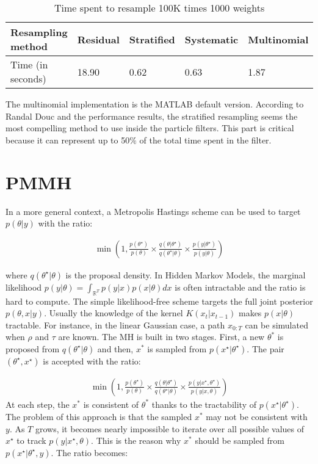 \documentclass[11pt,a4,twosided,singlespacing,titlepagenumber=on]{scrreprt}
\numberwithin{equation}{chapter} %
\theoremstyle{remark}
\begin{document}
\begin{table}[h]
\centering
\label{table1}
\begin{tabular}{|l|l|l|l|l|}
\hline
Resampling method     & Residual & Stratified & Systematic & Multinomial \\ \hline
Time (in seconds) & 18.90    & 0.62       & 0.63       & 1.87        \\ \hline
\end{tabular}
\caption{Time spent to resample 100K times 1000 weights}
\end{table}
The multinomial implementation is the MATLAB default version. According to Randal Douc and the performance results, the stratified resampling seems the most compelling method to use inside the particle filters. This part is critical because it can represent up to 50$\%$ of the total time spent in the filter.

\section{PMMH}

In a more general context, a Metropolis Hastings scheme can be used to target $p(\theta| y)$ with the ratio:

\begin{align*}
\min \left( 1, \frac{p(\theta^\star)}{p(\theta)} \times  \frac{q(\theta|\theta^\star)}{q(\theta^\star|\theta)} \times \frac{p({y}|\theta^\star)}{p({y}|\theta)} \right)
\end{align*}

where $q(\theta^\star|\theta)$ is the proposal density. In Hidden Markov Models, the marginal likelihood $p(y|\theta) = \int_{\mathbb{R}^T} p(y|x)p(x|\theta) dx$ is often intractable and the ratio is hard to compute. The simple likelihood-free scheme targets the full joint posterior $p(\theta,x|y)$. Usually the knowledge of the kernel $K(x_t|x_{t-1})$ makes $p(x|\theta)$ tractable. For instance, in the linear Gaussian case, a path $x_{0:T}$ can be simulated when $\rho$ and $\tau$ are known. The MH is built in two stages. First, a new $\theta^*$ is proposed from $q(\theta^\star|\theta)$ and then, $x^*$ is sampled from $p(x^\star|\theta^\star)$. The pair $(\theta^\star,x^\star)$ is accepted with the ratio:

\begin{align*}
\min \left( 1, \frac{p(\theta^\star)}{p(\theta)} \times  \frac{q(\theta|\theta^\star)}{q(\theta^\star|\theta)} \times \frac{p(y|{x}^\star,\theta^\star)}{p(y|{x},\theta)} \right)
\end{align*}
At each step, the $x^*$ is consistent of $\theta^*$ thanks to the tractability of $p(x^\star|\theta^\star)$. The problem of this approach is that the sampled $x^*$ may not be consistent with $y$. As $T$ grows, it becomes nearly impossible to iterate over all possible values of $x^\star$ to track $p(y|x^\star,\theta)$. This is the reason why $x^*$ should be sampled from $p(x^\star|\theta^\star,y)$. The ratio becomes:
\end{document}
